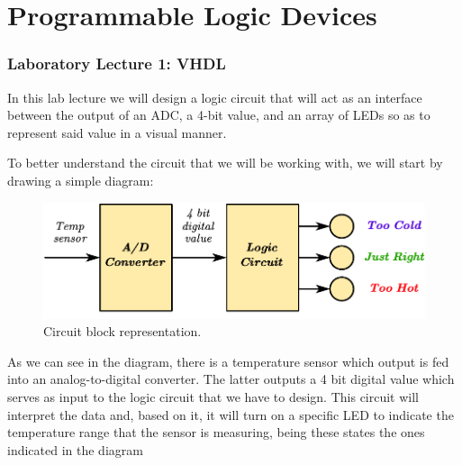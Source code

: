 \documentclass[a4paper, 11pt, oneside]{article}
\date{\today}
\begin{document}
 

\setcounter{ANIMATION}{1}




\thispagestyle{empty}
\setcounter{page}{0}
\tableofcontents
\clearpage




\part{Programmable Logic Devices} 

\clearpage

\section{Laboratory Lecture 1: VHDL}

In this lab lecture we will design a logic circuit that will act as an interface between the output of an ADC, a 4-bit value, and an array of LEDs so as to represent said value in a visual manner.\medskip

To better understand the circuit that we will be working with, we will start by drawing a simple diagram:\medskip

\begin{figure}[H]
    \centering
    \includegraphics[width=\linewidth]{Graphics/Practice 1/Temp_ADC_Logic.pdf}
    \caption{Circuit block representation.}
    \label{fig:tempcircuit}
\end{figure}

As we can see in the diagram, there is a temperature sensor which output is fed into an analog-to-digital converter. The latter outputs a 4 bit digital value which serves as input to the logic circuit that we have to design. This circuit will interpret the  data and, based on it, it will turn on a specific LED to indicate the temperature range that the sensor is measuring, being these states the ones indicated in the diagram\medskip
\end{document}
